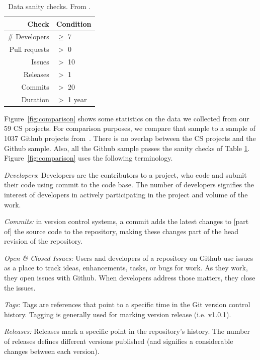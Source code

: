 \documentclass[sigconf,review,anonymous]{acmart}
\begin{document}
\begin{table}
\caption{Data sanity checks. From \cite{Kalliamvakou:2014}.}\label{tbl:sanity}
\footnotesize
 
 \begin{tabular}{r|l}
 Check   & Condition    \\\hline
 \# Developers & $\geq$ 7 \\
 Pull requests  & $>$ 0 \\
Issues & $>$ 10 \\
Releases &  $>$ 1 \\
Commits & $>$ 20 \\
Duration  & $>$ 1 year 
\end{tabular}%
 
\end{table}
Figure~\ref{fig:comparison} shows some statistics on the data we collected from our 59 CS projects. For comparison purposes, we compare that sample to 
a sample of 1037 Github projects from~\cite{Majumder19}.
There is no overlap between the CS projects and the Github sample. Also, all the Github
sample passes the sanity checks of Table \ref{tbl:sanity}. Figure~\ref{fig:comparison} uses the following terminology.

\textit{Developers}: Developers are the contributors to a project, who code and submit their code using commit to the code base. The number of developers signifies the interest of developers in actively participating in the project and volume of the work.
  
  

\textit{Commits:} in version control systems, a commit adds the latest changes to [part of] the source code to the repository, making these changes part of the head revision of the repository. 

\textit{Open \& Closed Issues:} Users and developers of a repository on Github use issues as a place to track ideas, enhancements, tasks, or bugs for work. As they work, they open issues with Github. When developers address those matters, they close the issues.

\textit{Tags}: Tags are references that point to a specific time in the Git version control history. Tagging is generally used for marking version release (i.e. v1.0.1).


\textit{Releases:} Releases mark a specific point in the repository’s history. The number of releases defines different versions published (and  signifies a considerable  changes  between each version).
\end{document}

